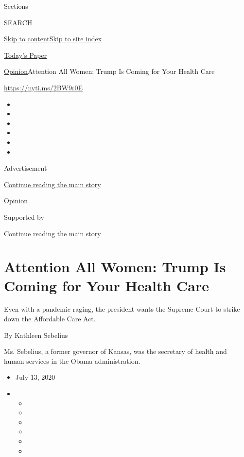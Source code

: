 Sections

SEARCH

\protect\hyperlink{site-content}{Skip to
content}\protect\hyperlink{site-index}{Skip to site index}

\href{https://myaccount.nytimes3xbfgragh.onion/auth/login?response_type=cookie\&client_id=vi}{}

\href{https://www.nytimes3xbfgragh.onion/section/todayspaper}{Today's
Paper}

\href{/section/opinion}{Opinion}\textbar{}Attention All Women: Trump Is
Coming for Your Health Care

\url{https://nyti.ms/2BW9r0E}

\begin{itemize}
\item
\item
\item
\item
\item
\item
\end{itemize}

Advertisement

\protect\hyperlink{after-top}{Continue reading the main story}

\href{/section/opinion}{Opinion}

Supported by

\protect\hyperlink{after-sponsor}{Continue reading the main story}

\hypertarget{attention-all-women-trump-is-coming-for-your-health-care}{%
\section{Attention All Women: Trump Is Coming for Your Health
Care}\label{attention-all-women-trump-is-coming-for-your-health-care}}

Even with a pandemic raging, the president wants the Supreme Court to
strike down the Affordable Care Act.

By Kathleen Sebelius

Ms. Sebelius, a former governor of Kansas, was the secretary of health
and human services in the Obama administration.

\begin{itemize}
\item
  July 13, 2020
\item
  \begin{itemize}
  \item
  \item
  \item
  \item
  \item
  \item
  \end{itemize}
\end{itemize}

